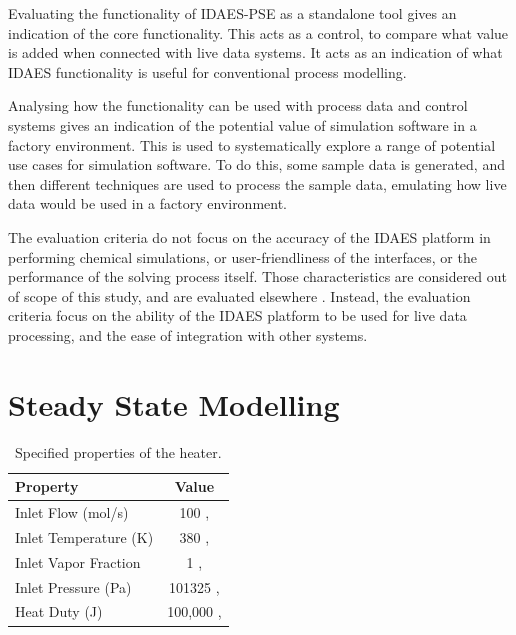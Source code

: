 \documentclass[12pt]{article}
\begin{document}
Evaluating the functionality of IDAES-PSE as a standalone tool gives an indication of the core functionality. This acts as a control, to compare what value is added when connected with live data systems. It acts as an indication of what IDAES functionality is useful for conventional process modelling.

Analysing how the functionality can be used with process data and control systems gives an indication of the potential value of simulation software in a factory environment. This is used to systematically explore a range of potential use cases for simulation software. 
To do this, some sample data is generated, and then different techniques are used to process the sample data, emulating how live data would be used in a factory environment.

The evaluation criteria do not focus on the accuracy of the IDAES platform in performing chemical simulations, or user-friendliness of the interfaces, or the performance of the solving process itself. Those characteristics are considered out of scope of this study, and are evaluated elsewhere \cite{hart2011pyomo} \cite{myhre2022investigation}. Instead, the evaluation criteria focus on the ability of the IDAES platform to be used for live data processing, and the ease of integration with other systems.









\section{Steady State Modelling} \label{sec:steady_state}

\begin{table}[h]
    \centering
    \begin{tabular}{|l|c|}
        \hline
        \textbf{Property} & \textbf{Value} \\
        \hline
        Inlet Flow (mol/s) & 100 , \\
        \hline
        Inlet Temperature (K) & 380 , \\
        \hline
        Inlet Vapor Fraction & 1 ,  \\
        \hline
        Inlet Pressure (Pa) & 101325 ,  \\
        \hline
        Heat Duty (J) & 100,000 , \\
        \hline
    \end{tabular}
    \caption{Specified properties of the heater.}
    \label{tab:heater_properties}
\end{table}
\end{document}
